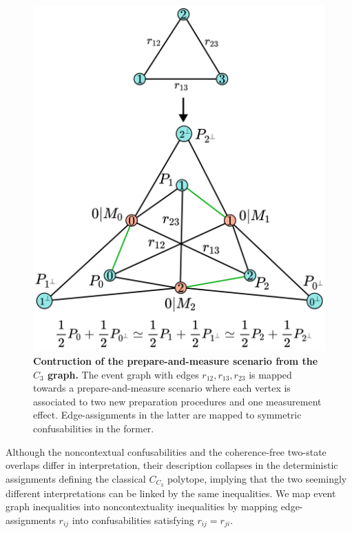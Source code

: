 \documentclass[letterpaper,onecolumn,12pt,accepted=2024-01-17]{article}
\begin{document}
\begin{figure}[tb]
    \centering
    \includegraphics[width=\columnwidth]{Acc_Figures/FromC3toLSSS.png}
    \caption{\textbf{Contruction of the prepare-and-measure scenario from the $C_3$ graph.} The event graph with edges $r_{12},r_{13},r_{23}$ is mapped towards a prepare-and-measure scenario where each vertex is associated to two new preparation procedures and one measurement effect. Edge-assignments in the latter are mapped to symmetric confusabilities in the former.}
    \label{fig:From Event Graph to Operational Scenarios}
\end{figure}

Although the noncontextual confusabilities and the coherence-free two-state overlaps differ in interpretation, their description collapses in the deterministic assignments defining the classical $C_{C_3}$ polytope, implying that the two seemingly different interpretations can be linked by the same inequalities. We map event graph inequalities into noncontextuality inequalities by mapping edge-assignments $r_{ij}$ into confusabilities satisfying $r_{ij}=r_{ji}$.
\end{document}
